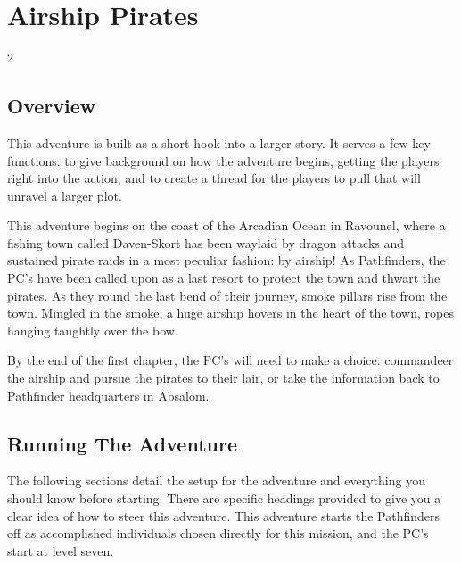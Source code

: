 
\clearpage

\pfMakeSplashHeader[
  image = images/inside,
  title = Airship Pirates,
  headerHeight = -7cm,
  textBodyHeight = 6cm
]
  
\chapter{Airship Pirates}

\begin{multicols}{2}
\addSidebar %
\vspace{-.64in} %
  \section{Overview}
  This adventure is built as a short hook into a larger story. It serves a few key functions: to give background on how the adventure begins, getting the players right into the action, and to create a thread for the players to pull that will unravel a larger plot. 
  
  This adventure begins on the coast of the Arcadian Ocean in Ravounel, where a fishing town called Daven-Skort has been waylaid by dragon attacks and sustained pirate raids in a most peculiar fashion: by airship! As Pathfinders, the PC's have been called upon as a last resort to protect the town and thwart the pirates.  As they round the last bend of their journey, smoke pillars rise from the town. Mingled in the smoke, a huge airship hovers in the heart of the town, ropes hanging taughtly over the bow. 

  By the end of the first chapter, the PC's will need to make a choice: commandeer the airship and pursue the pirates to their lair, or take the information back to Pathfinder headquarters in Absalom.

  \section{Running The Adventure}
  The following sections detail the setup for the adventure and everything you should know before starting. There are specific headings provided to give you a clear idea of how to steer this adventure. This adventure starts the Pathfinders off as accomplished individuals chosen directly for this mission, and the PC's start at level seven.


\end{multicols}
